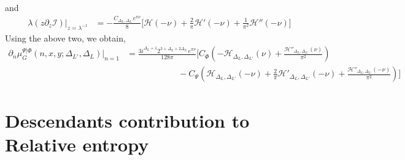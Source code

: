 \documentclass[11pt]{article}
\newcommand{\p}{\partial}
\newcommand{\nn}{\nonumber}
\newcommand{\lb}{\left(}
\newcommand{\rb}{\right)}
\begin{document}
and
\begin{align}
    \lambda(z\p_z \mathcal{I})|_{z=\lambda^{-1}} &= -\frac{C_{\Delta_L,\Delta_{L'}}e^{\pi\nu}}{8} \big[ \mathcal{H}(-\nu) + \frac{2}{\pi}\mathcal{H}'(-\nu) + \frac{1}{\pi^2}\mathcal{H}''(-\nu)\big]
\end{align}
Using the above two, we obtain,
\begin{align}
    \p_n\mu_G^{\Psi|\Phi} (n,x,y;\Delta_{L'},\Delta_L)|_{n=1} &= \frac{3i^{\Delta_L+1}2^{3+\Delta_L+2\Delta_{L'}}e^{\pi \nu}}{128\pi} \Bigg[ C_\Phi \lb -\mathcal{H}_{\Delta_L,\Delta_{L'}}(\nu) + \frac{\mathcal{H}''_{\Delta_L,\Delta_{L'}}(\nu)}{\pi^2} \rb \nn \\
    &\qquad\qquad\qquad- C_\Psi \lb \mathcal{H}_{\Delta_L,\Delta_{L'}}(-\nu) + \frac{2}{\pi}\mathcal{H}'_{\Delta_L,\Delta_{L'}}(-\nu)+\frac{\mathcal{H}''_{\Delta_L,\Delta_{L'}}(-\nu)}{\pi^2}\rb\Bigg]
\end{align}



\section{Descendants contribution to Relative entropy}
\end{document}
